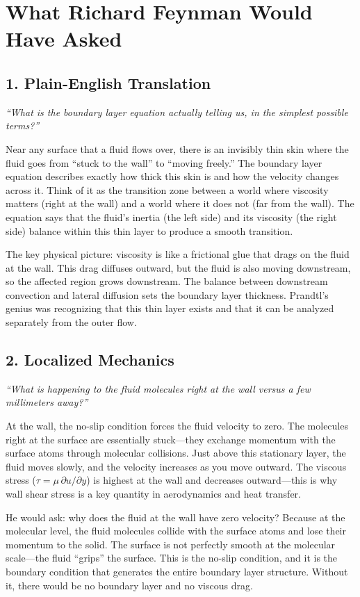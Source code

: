 \documentclass[11pt,openright]{book}
\begin{document}
\section*{What Richard Feynman Would Have Asked}

\subsection*{1. Plain-English Translation}
\textit{``What is the boundary layer equation actually telling us, in the simplest possible terms?''}

Near any surface that a fluid flows over, there is an invisibly thin skin where the fluid goes from ``stuck to the wall'' to ``moving freely.'' The boundary layer equation describes exactly how thick this skin is and how the velocity changes across it. Think of it as the transition zone between a world where viscosity matters (right at the wall) and a world where it does not (far from the wall). The equation says that the fluid's inertia (the left side) and its viscosity (the right side) balance within this thin layer to produce a smooth transition.

The key physical picture: viscosity is like a frictional glue that drags on the fluid at the wall. This drag diffuses outward, but the fluid is also moving downstream, so the affected region grows downstream. The balance between downstream convection and lateral diffusion sets the boundary layer thickness. Prandtl's genius was recognizing that this thin layer exists and that it can be analyzed separately from the outer flow.

\subsection*{2. Localized Mechanics}
\textit{``What is happening to the fluid molecules right at the wall versus a few millimeters away?''}

At the wall, the no-slip condition forces the fluid velocity to zero. The molecules right at the surface are essentially stuck---they exchange momentum with the surface atoms through molecular collisions. Just above this stationary layer, the fluid moves slowly, and the velocity increases as you move outward. The viscous stress ($\tau = \mu \, \partial u / \partial y$) is highest at the wall and decreases outward---this is why wall shear stress is a key quantity in aerodynamics and heat transfer.

He would ask: why does the fluid at the wall have zero velocity? Because at the molecular level, the fluid molecules collide with the surface atoms and lose their momentum to the solid. The surface is not perfectly smooth at the molecular scale---the fluid ``grips'' the surface. This is the no-slip condition, and it is the boundary condition that generates the entire boundary layer structure. Without it, there would be no boundary layer and no viscous drag.
\end{document}

